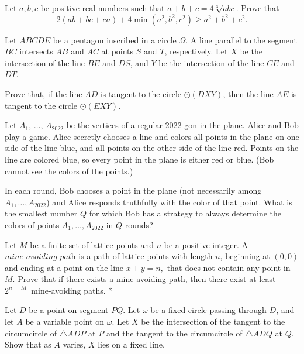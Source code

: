 \documentclass[11pt]{scrartcl}
\begin{document}
\begin{problem}[329519083206921]
Let \(a,b,c\) be positive real numbers such that \(a+b+c=4\sqrt[3]{abc}\). Prove that\[2(ab+bc+ca)+4\min(a^2,b^2,c^2)\ge a^2+b^2+c^2.\]
\end{problem}
\begin{problem}[5867489266334805897]
	Let $ABCDE$ be a pentagon inscribed in a circle $\Omega$. A line parallel to the segment $BC$ intersects $AB$ and $AC$ at points $S$ and $T$, respectively. Let $X$ be the intersection of the line $BE$ and $DS$, and $Y$ be the intersection of the line $CE$ and $DT$.

Prove that, if the line $AD$ is tangent to the circle $\odot(DXY)$, then the line $AE$ is tangent to the circle $\odot(EXY)$.
\end{problem}
\begin{problem}[836212333854709]
	Let $A_1$, $\ldots$, $A_{2022}$ be the vertices of a regular $2022$-gon in the plane. Alice and Bob play a game. Alice secretly chooses a line and colors all points in the plane on one side of the line blue, and all points on the other side of the line red. Points on the line are colored blue, so every point in the plane is either red or blue. (Bob cannot see the colors of the points.)

In each round, Bob chooses a point in the plane (not necessarily among $A_1, \ldots, A_{2022}$) and Alice responds truthfully with the color of that point. What is the smallest number $Q$ for which Bob has a strategy to always determine the colors of points $A_1, \ldots, A_{2022}$ in $Q$ rounds?
\end{problem}
\begin{problem}[2886276736199315342]
	Let $M$ be a finite set of lattice points and $n$ be a positive integer. A $\textit{mine-avoiding path}$ is a path of lattice points with length $n$, beginning at $(0,0)$ and ending at a point on the line $x+y=n,$ that does not contain any point in $M$. Prove that if there exists a mine-avoiding path, then there exist at least $2^{n-|M|}$ mine-avoiding paths. *
\end{problem}
\begin{problem}[8152181601565653036]
Let \(D\) be a point on segment \(PQ\). Let \(\omega\) be a fixed circle passing through \(D\), and let \(A\) be a variable point on \(\omega\). Let \(X\) be the intersection of the tangent to the circumcircle of \(\triangle ADP\) at \(P\) and the tangent to the circumcircle of \(\triangle ADQ\) at \(Q\). Show that as \(A\) varies, \(X\) lies on a fixed line.
\end{problem}
\end{document}
